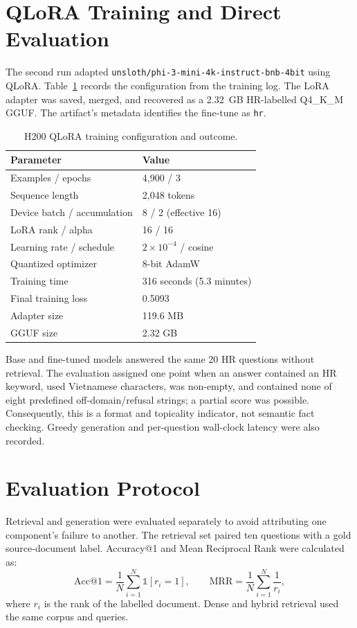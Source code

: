 \documentclass[12pt,a4paper,oneside]{report}
\begin{document}
\section{QLoRA Training and Direct Evaluation}
The second run adapted \texttt{unsloth/phi-3-mini-4k-instruct-bnb-4bit} using
QLoRA. Table~\ref{tab:training} records the configuration from the training log.
The LoRA adapter was saved, merged, and recovered as a 2.32~GB HR-labelled
Q4\_K\_M GGUF. The artifact's metadata identifies the fine-tune as
\texttt{hr}.

\begin{table}[H]
\centering
\caption{H200 QLoRA training configuration and outcome.}
\label{tab:training}
\small
\begin{tabular}{@{}ll@{}}
\toprule
\textbf{Parameter} & \textbf{Value} \\
\midrule
Examples / epochs & 4,900 / 3 \\
Sequence length & 2,048 tokens \\
Device batch / accumulation & 8 / 2 (effective 16) \\
LoRA rank / alpha & 16 / 16 \\
Learning rate / schedule & $2\times10^{-4}$ / cosine \\
Quantized optimizer & 8-bit AdamW \\
Training time & 316 seconds (5.3 minutes) \\
Final training loss & 0.5093 \\
Adapter size & 119.6 MB \\
GGUF size & 2.32 GB \\
\bottomrule
\end{tabular}
\end{table}

Base and fine-tuned models answered the same 20 HR questions without retrieval.
The evaluation assigned one point when an answer contained an HR keyword, used
Vietnamese characters, was non-empty, and contained none of eight predefined
off-domain/refusal strings; a partial score was possible. Consequently, this is
a format and topicality indicator, not semantic fact checking. Greedy generation
and per-question wall-clock latency were also recorded.

\section{Evaluation Protocol}
Retrieval and generation were evaluated separately to avoid attributing one
component's failure to another. The retrieval set paired ten questions with a
gold source-document label. Accuracy@1 and Mean Reciprocal Rank were calculated
as:
\begin{equation}
\mathrm{Acc@1} = \frac{1}{N} \sum_{i=1}^{N} \mathbb{1}[r_i = 1], \qquad
\mathrm{MRR} = \frac{1}{N} \sum_{i=1}^{N} \frac{1}{r_i},
\label{eq:metrics}
\end{equation}
where $r_i$ is the rank of the labelled document. Dense and hybrid retrieval
used the same corpus and queries.
\end{document}
